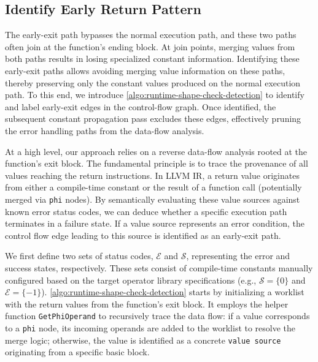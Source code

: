 \subsection{Identify Early Return Pattern}\label{sec:design:early-return}

% 

The early-exit path bypasses the normal execution path, and these two paths often join at the function's ending block. 
At join points, merging values from both paths results in losing specialized constant information. 
Identifying these early-exit paths allows avoiding merging value information on these paths, thereby preserving only the constant values produced on the normal execution path.
To this end, we introduce \autoref{algo:runtime-shape-check-detection} to identify and label early-exit edges in the control-flow graph.
Once identified, the subsequent constant propagation pass excludes these edges, effectively pruning the error handling paths from the data-flow analysis.

At a high level, our approach relies on a reverse data-flow analysis rooted at the function's exit block. 
The fundamental principle is to trace the provenance of all values reaching the return instructions. 
In LLVM IR, a return value originates from either a compile-time constant or the result of a function call (potentially merged via \texttt{phi} nodes). 
By semantically evaluating these value sources against known error status codes, we can deduce whether a specific execution path terminates in a failure state. 
If a value source represents an error condition, the control flow edge leading to this source is identified as an early-exit path.

We first define two sets of status codes, $\mathcal{E}$ and $\mathcal{S}$, representing the error and success states, respectively. 
These sets consist of compile-time constants manually configured based on the target operator library specifications (e.g., $\mathcal{S}=\{0\}$ and $\mathcal{E}=\{-1\}$).
\autoref{algo:runtime-shape-check-detection} starts by initializing a worklist with the return values from the function's exit block.
It employs the helper function \texttt{GetPhiOperand} to recursively trace the data flow: if a value corresponds to a \texttt{phi} node, its incoming operands are added to the worklist to resolve the merge logic; otherwise, the value is identified as a concrete \texttt{value source} originating from a specific basic block.

